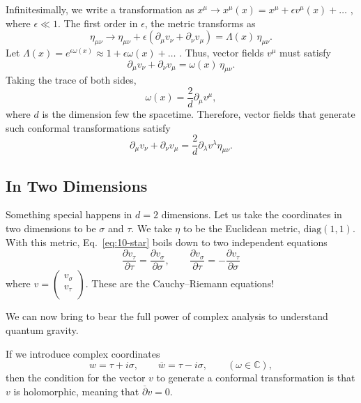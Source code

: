 Infinitesimally, we write a transformation as $x^{\mu} \to x^{\mu}(x) = x^{\mu} + \epsilon v^{\mu}(x) + \dots$ , where $\epsilon \ll 1$.
The first order in $\epsilon$, the metric transforms as
 \begin{equation}
  \eta_{\mu\nu} \to \eta_{\mu\nu} + \epsilon(\partial_{\mu} v_{\nu} + \partial_{\nu} v_{\mu}) = \Lambda(x) \, \eta_{\mu\nu}.
\end{equation}
Let $\Lambda(x) = e^{\epsilon \omega(x)} \approx 1 + \epsilon \omega(x) + \dots$ .
Thus, vector fields $v^{\mu}$ must satisfy
\begin{equation}
  \partial_{\mu} v_{\nu} + \partial_{\nu} v_{\mu} = \omega(x)\, \eta_{\mu\nu}.
\end{equation}
Taking the trace of both sides,
\begin{equation}
  \omega(x) = \frac{2}{d} \partial_{\mu} v^{\mu},
\end{equation}
where $d$ is the dimension few the spacetime.
Therefore, vector fields that generate such conformal transformations satisfy
\begin{equation}
  \label{eq:10-star}
  \partial_{\mu} v_{\nu} + \partial_{\nu} v_{\mu} = \frac{2}{d} \partial_{\lambda} v^{\lambda} \eta_{\mu\nu}.
\end{equation}

\subsection{In Two Dimensions}%
\label{sub:in_two_dimensions}

Something special happens in $d = 2$ dimensions.
Let us take the coordinates in two dimensions to be $\sigma$ and $\tau$. We take $\eta$ to be the Euclidean metric, $\text{diag}(1, 1)$.
With this metric, Eq.~\eqref{eq:10-star} boils down to two independent equations
\begin{equation}
  \boxed{\frac{\partial v_\tau}{\partial \tau} = \frac{\partial v_{\sigma}}{\partial \sigma}, \qquad \frac{\partial v_{\sigma}}{\partial \tau} = - \frac{\partial v_{\tau}}{\partial \sigma}}
\end{equation}
where $v = 
\begin{pmatrix}
v_{\sigma} \\
v_{\tau} \\
\end{pmatrix}$.
These are the Cauchy--Riemann equations!
\begin{remark}
  We can now bring to bear the full power of complex analysis to understand quantum gravity.
\end{remark}
If we introduce complex coordinates
\begin{equation}
  w = \tau + i \sigma, \qquad \overline{w}{} = \tau -i \sigma, \qquad (\omega \in \mathbb{C}),
\end{equation}
then the condition for the vector $v$ to generate a conformal transformation is that $v$ is holomorphic, meaning that $\overline{\partial}{}v = 0$.

